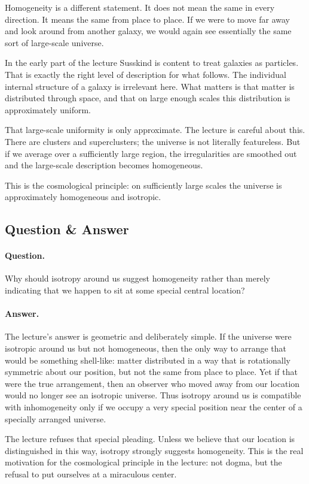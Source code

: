 Homogeneity is a different statement. It does not mean the same in every direction. It means the same from place to place. If we were to move far away and look around from another galaxy, we would again see essentially the same sort of large-scale universe.

In the early part of the lecture Susskind is content to treat galaxies as particles. That is exactly the right level of description for what follows. The individual internal structure of a galaxy is irrelevant here. What matters is that matter is distributed through space, and that on large enough scales this distribution is approximately uniform.

That large-scale uniformity is only approximate. The lecture is careful about this. There are clusters and superclusters; the universe is not literally featureless. But if we average over a sufficiently large region, the irregularities are smoothed out and the large-scale description becomes homogeneous.

This is the cosmological principle: on sufficiently large scales the universe is approximately homogeneous and isotropic.

\subsection{Question \& Answer}

\paragraph{Question.} Why should isotropy around us suggest homogeneity rather than merely indicating that we happen to sit at some special central location?

\paragraph{Answer.} The lecture's answer is geometric and deliberately simple. If the universe were isotropic around us but not homogeneous, then the only way to arrange that would be something shell-like: matter distributed in a way that is rotationally symmetric about our position, but not the same from place to place. Yet if that were the true arrangement, then an observer who moved away from our location would no longer see an isotropic universe. Thus isotropy around us is compatible with inhomogeneity only if we occupy a very special position near the center of a specially arranged universe.

The lecture refuses that special pleading. Unless we believe that our location is distinguished in this way, isotropy strongly suggests homogeneity. This is the real motivation for the cosmological principle in the lecture: not dogma, but the refusal to put ourselves at a miraculous center.

